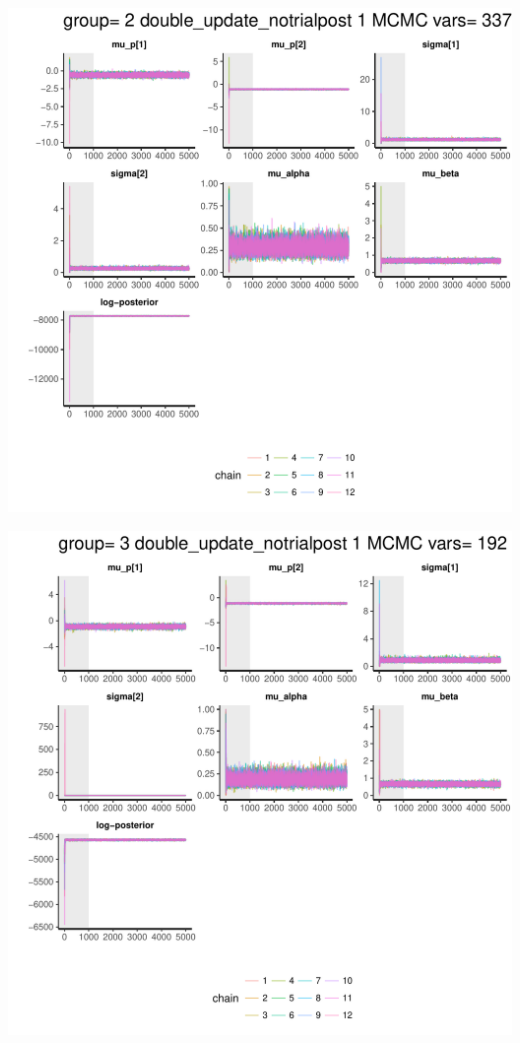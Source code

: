 \documentclass{article}\usepackage[]{graphicx}\usepackage[]{color}
\makeatletter
\def\maxwidth{ %
  \ifdim\Gin@nat@width>\linewidth
    \linewidth
  \else
    \Gin@nat@width
  \fi
}
\newenvironment{knitrout}{}{} %
\makeatother
\begin{document}
\begin{knitrout}
\color{fgcolor}
\includegraphics[width=\maxwidth]{figure/unnamed-chunk-10-1} 

\includegraphics[width=\maxwidth]{figure/unnamed-chunk-10-2} 


\end{knitrout}
\end{document}
